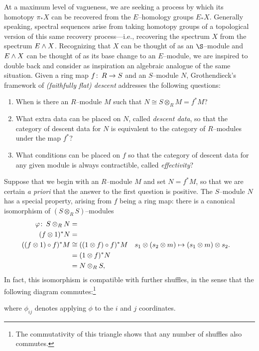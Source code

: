 At a maximum level of vagueness, we are seeking a process by which its homotopy $\pi_* X$ can be recovered from the $E$--homology groups $E_* X$.  Generally speaking, spectral sequences arise from taking homotopy groups of a topological version of this same recovery process---i.e., recovering the spectrum $X$ from the spectrum $E \wedge X$.  Recognizing that $X$ can be thought of as an $\S$--module and $E \wedge X$ can be thought of as its base change to an $E$--module, we are inspired to double back and consider as inspiration an algebraic analogue of the same situation.  Given a ring map $f\colon\thinspace R \to S$ and an $S$--module $N$, Grothendieck's framework of \textit{(faithfully flat) descent} addresses the following questions:
\begin{enumerate}
\item When is there an $R$--module $M$ such that $N \cong S \otimes_R M = f^* M$?
\item What extra data can be placed on $N$, called \textit{descent data}, so that the category of descent data for $N$ is equivalent to the category of $R$--modules under the map $f^*$?
\item What conditions can be placed on $f$ so that the category of descent data for any given module is always contractible, called \textit{effectivity}?
\end{enumerate}

Suppose that we begin with an $R$--module $M$ and set $N = f^* M$, so that we are certain \emph{a priori} that the answer to the first question is positive.  The $S$--module $N$ has a special property, arising from $f$ being a ring map: there is a canonical isomorphism of $(S \otimes_R S)$--modules
\begin{align*}
\varphi\colon\thinspace S \otimes_R N & = \\
(f \otimes 1)^* N & = \\
((f \otimes 1) \circ f)^* M & \cong ((1 \otimes f) \circ f)^* M & s_1 \otimes (s_2 \otimes m) & \mapsto (s_1 \otimes m) \otimes s_2. \\
& = (1 \otimes f)^* N \\
& = N \otimes_R S, \\
\end{align*}
In fact, this isomorphism is compatible with further shuffles, in the sense that the following diagram commutes:\footnote{The commutativity of this triangle shows that any number of shuffles also commutes.}
\begin{center}
\end{center}
where $\phi_{ij}$ denotes applying $\phi$ to the $i${\th} and $j${\th} coordinates.

